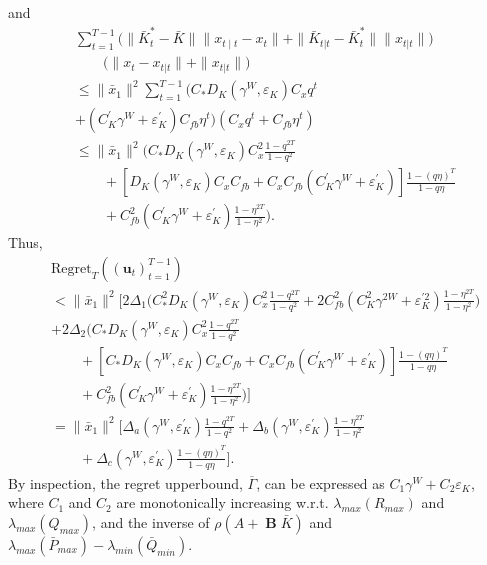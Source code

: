 \documentclass[letterpaper, 10 pt, conference]{ieeeconf}  %
\newcommand{\transpose}{\mathsf{T}}
\DeclareMathOperator{\contB}{\mathbf{B}}
\begin{document}
and
\begin{align*}
   &\sum_{t=1}^{T-1}\bigg( \|\bar{K}_{t}^{*}-\bar{K}\|\|x_{t\mid t}-x_{t}\|  + \|\bar{K}_{t|t}-\bar{K}_{t}^{*}\| \|x_{t|t}\|\bigg)\\
   &\qquad \bigg(\|x_{t}-x_{t|t}\| + \|x_{t|t}\|\bigg)\\
   &\leq \|\bar{x}_{1}\|^{2}\sum_{t=1}^{T-1}\bigg(C_{*}D_{K}(\gamma^{W},\varepsilon_{K})C_{x}q^{t}\\
   &+(C_{K}^{'}\gamma^{W}+\varepsilon_{K}^{'})C_{fb}\eta^{t}\bigg)(C_{x}q^{t}+C_{fb}\eta^{t})\\
   &\leq \|\bar{x}_{1}\|^{2}\bigg(C_{*}D_{K}(\gamma^{W},\varepsilon_{K})C_{x}^{2}\frac{1-q^{2T}}{1-q^{2}}\\
   &\qquad +[D_{K}(\gamma^{W},\varepsilon_{K})C_{x}C_{fb}+C_{x}C_{fb}(C_{K}^{'}\gamma^{W}+\varepsilon_{K}^{'})]\frac{1-(q\eta)^{T}}{1-q\eta}\\
   &\qquad + C_{fb}^{2}(C_{K}^{'}\gamma^{W}+\varepsilon_{K}^{'})\frac{1-\eta^{2T}}{1-\eta^{2}} \bigg).
\end{align*}
Thus,
\begin{align*}
   &\text{Regret}_{T}((\mathbf{u}_{t})_{t=1}^{T-1})\\
   &< \|\bar{x}_{1}\|^{2}\bigg[ 2\Delta_{1}\bigg(C_{*}^{2}D_{K}(\gamma^{W},\varepsilon_{K})C_{x}^{2}\frac{1-q^{2T}}{1-q^{2}} + 2C_{fb}^{2}(C_{K}^{2}\gamma^{2W}+\varepsilon_{K}^{'2})\frac{1-\eta^{2T}}{1-\eta^{2}} \bigg)\\
   &+2\Delta_{2}\bigg(C_{*}D_{K}(\gamma^{W},\varepsilon_{K})C_{x}^{2}\frac{1-q^{2T}}{1-q^{2}}\\
   &\qquad+[C_{*}D_{K}(\gamma^{W},\varepsilon_{K})C_{x}C_{fb}
    +C_{x}C_{fb}(C_{K}^{'}\gamma^{W}+\varepsilon_{K}^{'})]\frac{1-(q\eta)^{T}}{1-q\eta}\\
   &\qquad+ C_{fb}^{2}(C_{K}^{'}\gamma^{W}+\varepsilon_{K}^{'})\frac{1-\eta^{2T}}{1-\eta^{2}} \bigg)\bigg]\\
   &= \|\bar{x}_{1}\|^{2}\bigg[\Delta_{a}(\gamma^{W},\varepsilon_{K}^{'})\frac{1-q^{2T}}{1-q^{2}} +  \Delta_{b}(\gamma^{W},\varepsilon_{K}^{'})\frac{1-\eta^{2T}}{1-\eta^{2}}\\
   &\qquad + \Delta_{c}(\gamma^{W},\varepsilon_{K}^{'})\frac{1-(q\eta)^{T}}{1-q\eta}\bigg].
\end{align*}
By inspection, the regret upperbound, $\overline{\Gamma}$, can be expressed as $C_{1}\gamma^{W}+C_{2}\varepsilon_{K}$, where $C_{1}$ and $C_{2}$ are monotonically increasing w.r.t. $\lambda_{max}(R_{max})$ and $\lambda_{max}(Q_{max})$, and the inverse of $\rho(A+\contB\bar{K})$ and $\lambda_{max}(\bar{P}_{max})-\lambda_{min}(\bar{Q}_{min})$. 

\end{document}
